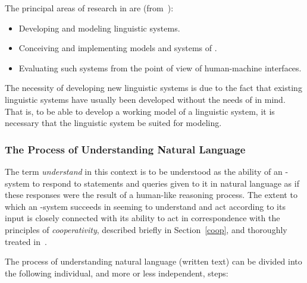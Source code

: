 The principal areas of research in {\nlp} are (from~\cite{gal}):

\begin{itemize}
  \item Developing and modeling linguistic systems.
  \item Conceiving and implementing models and systems of {\nlp}.
  \item Evaluating such systems from the point of view of
    human-machine interfaces.
\end{itemize}

The necessity of developing new linguistic systems is due to the fact
that existing linguistic systems have usually been developed without
the needs of {\nlp} in mind. That is, to be able to develop a working
model of a linguistic system, it is necessary that the linguistic
system be suited for modeling.

\subsubsection{The Process of Understanding Natural Language}

The term {\em understand\/} in this context is to be understood as the
ability of an {\nlp}-system to respond to statements and queries given
to it in natural language as if these responses were the result of a
human-like reasoning process. The extent to which an {\nlp}-system
succeeds in seeming to understand and act according to its input is
closely connected with its ability to act in correspondence with the
principles of {\em cooperativity\/}, described briefly in
Section~\ref{coop}, and thoroughly treated in~\cite{torulf}.

The process of understanding natural language (written text) can be
divided into the following individual, and more or less independent,
steps:

